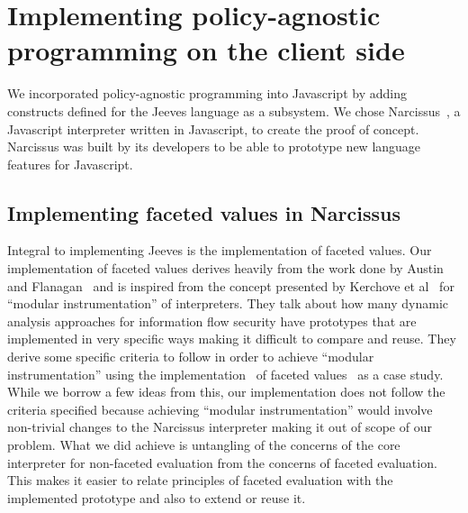\chapter{Implementing policy-agnostic programming on the client side\label{chap:solution}}
We incorporated policy-agnostic programming into Javascript by adding constructs
defined for the Jeeves language as a subsystem. We chose Narcissus~\cite{narc},
a Javascript interpreter written in Javascript, to create the proof of concept.
Narcissus was built by its developers to be able to prototype new language features
for Javascript.

\section{Implementing faceted values in Narcissus}
Integral to implementing Jeeves is the implementation of faceted values. Our implementation
of faceted values derives heavily from the work done by Austin and Flanagan~\cite{Faceted}
and is inspired from the concept presented by Kerchove et al~\cite{Modular} for
``modular instrumentation'' of interpreters. They talk about how many dynamic analysis
approaches for information flow security have prototypes that are implemented in
very specific ways making it difficult to compare and reuse. They derive some
specific criteria to follow in order to achieve ``modular instrumentation'' using
the implementation~\cite{ZaphodFacets} of faceted values~\cite{Faceted} as a case
study. While we borrow a few ideas from this, our implementation does not follow
the criteria specified because achieving ``modular instrumentation'' would involve
non-trivial changes to the Narcissus interpreter making it out of scope of our problem.
What we did achieve is untangling of the concerns of the core interpreter for non-faceted
evaluation from the concerns of faceted evaluation. This makes it easier to relate
principles of faceted evaluation with the implemented prototype and also to extend
or reuse it.

